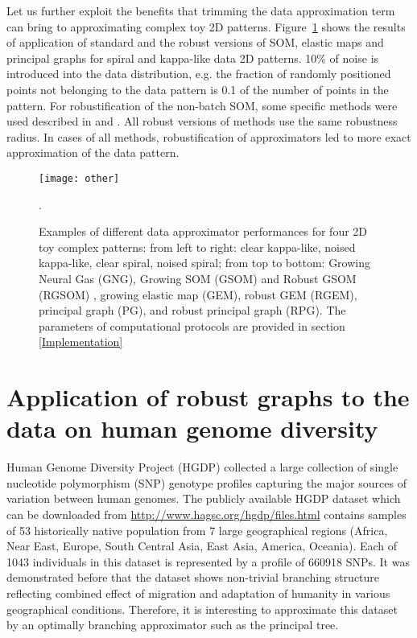 \documentclass[graybox]{archivesofdatascience}
\begin{document}
Let us further exploit the benefits that trimming the data approximation term can bring to approximating complex toy 2D patterns. Figure~\ref{GORBANROTHER} shows the results of application of standard and the robust versions of SOM, elastic maps and principal graphs for spiral and kappa-like data 2D patterns. 10\% of noise is introduced into the data distribution, e.g. the fraction of randomly positioned points not belonging to the data pattern is 0.1 of the number of points in the pattern. For robustification of the non-batch SOM, some specific methods were used described in \citet{allende2004robust} and \citet{kohonen2001self}. All robust versions of methods use the same robustness radius. In cases of all methods, robustification of approximators led to more exact approximation of the data pattern.

\begin{figure}[tbp]
\texttt{[image: other]}
\caption{Examples of different data approximator performances for four 2D toy complex patterns: from left to right: clear kappa-like, noised kappa-like, clear spiral, noised spiral; from top to bottom: Growing Neural Gas (GNG)\citep{martinetz1993neural}, Growing SOM (GSOM) and Robust GSOM (RGSOM) \citep{Alahakoon2000}, growing elastic map (GEM), robust GEM (RGEM), principal graph (PG)\citep{gorban2007topological,GorbanHand}, and robust principal graph (RPG). The parameters of computational protocols are provided in section \ref{Implementation}}.
\label{GORBANROTHER}       \end{figure}


\section{Application of robust graphs to the data on human genome diversity}

Human Genome Diversity Project (HGDP) collected a large collection of single nucleotide polymorphism (SNP) genotype profiles capturing the major sources of variation between human genomes. The publicly available HGDP dataset which can be downloaded from \url{http://www.hagsc.org/hgdp/files.html} contains samples of 53 historically native population from 7 large geographical regions (Africa, Near East, Europe, South Central Asia, East Asia, America, Oceania). Each of 1043 individuals in this dataset is represented by a profile of 660918 SNPs. It was demonstrated before that the dataset shows non-trivial branching structure reflecting combined effect of migration and adaptation of humanity in various geographical conditions\citep{Elhaik2014}. Therefore, it is interesting to approximate this dataset by an optimally branching approximator such as the principal tree.
\end{document}
